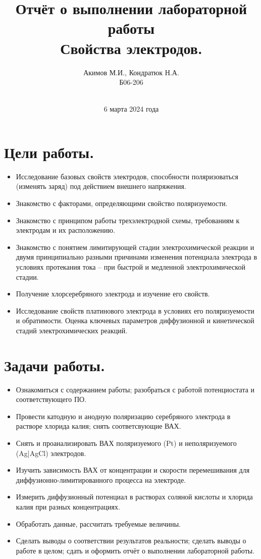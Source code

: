 \documentclass[a4paper, 11pt]{article}%
\author{Акимов М.И., Кондратюк Н.А. \\ Б06-206}
\title{Отчёт о выполнении лабораторной работы  \\ \textbf{Свойства электродов.}}
\date{\\6 марта 2024 года}
\begin{document}
 \maketitle

       \section{Цели работы.}
        \begin{itemize}
             \item Исследование базовых свойств электродов, способности поляризоваться (изменять заряд) под действием внешнего напряжения. 
             \item Знакомство с факторами, определяющими свойство поляризуемости.
             \item Знакомство с принципом работы трехэлектродной схемы, требованиям к электродам и их расположению.
             \item Знакомство с понятием лимитирующей стадии электрохимической реакции и двумя принципиально разными причинами изменения потенциала электрода в условиях протекания тока – при быстрой и медленной электрохимической стадии.
             \item Получение хлорсеребряного электрода и изучение его свойств.
             \item Исследование свойств платинового электрода в условиях его поляризуемости и обратимости. Оценка ключевых параметров диффузионной и кинетической стадий электрохимических реакций.
        \end{itemize}

        \section{Задачи работы.}
        \begin{itemize}
             \item Ознакомиться с содержанием работы; разобраться с работой потенциостата и соответствующего ПО.
             \item Провести катодную и анодную поляризацию серебряного электрода в растворе хлорида калия; снять соответсвующие ВАХ. 
             \item Снять и проанализировать ВАХ поляризуемого (Pt) и неполяризуемого (Ag|AgCl) электродов. 
             \item Изучить зависимость ВАХ от концентрации и скорости перемешивания для диффузионно-лимитированного процесса на электроде. 
             \item Измерить диффузионный потенциал в растворах соляной кислоты и хлорида калия при разных концентрациях.
             \item Обработать данные, рассчитать требуемые величины.
             \item Сделать выводы о соответствии результатов реальности; сделать выводы о работе в целом; сдать и оформить отчёт о выполнении лабораторной работы.
        \end{itemize}
        \newpage
\end{document}
